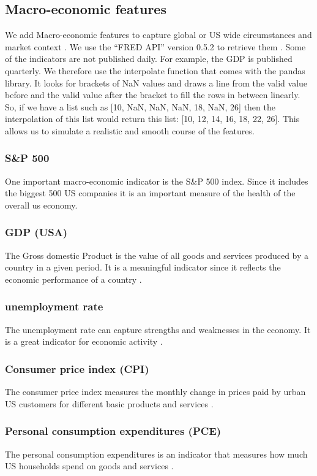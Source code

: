 \documentclass[a4paper,12pt]{report}
\begin{document}
			
		\subsection{Macro-economic features}
		We add Macro-economic features to capture global or US wide circumstances and market context \cite{38}. We use the “FRED API” version 0.5.2 to retrieve them \cite{37}. Some of the indicators are not published daily. For example, the GDP is published quarterly. We therefore use the interpolate function that comes with the pandas library. It looks for brackets of NaN values and draws a line from the valid value before and the valid value after the bracket to fill the rows in between linearly. So, if we have a list such as [10, NaN, NaN, NaN, 18, NaN, 26] then the interpolation of this list would return this list: [10, 12, 14, 16, 18, 22, 26]. This allows us to simulate a realistic and smooth course of the features.
			\subsubsection{S\&P 500}
			One important macro-economic indicator is the S\&P 500 index. Since it includes the biggest 500 US companies it is an important measure of the health of the overall us economy.
			\subsubsection{GDP (USA)}
			The Gross domestic Product is the value of all goods and services produced by a country in a given period. It is a meaningful indicator since it reflects the economic performance of a country \cite{38}.
			\subsubsection{unemployment rate}
			The unemployment rate can capture strengths and weaknesses in the economy. It is a great indicator for economic activity \cite{38}.
			\subsubsection{Consumer price index (CPI)}
			The consumer price index measures the monthly change in prices paid by urban US customers for different basic products and services \cite{39}.
			\subsubsection{Personal consumption expenditures (PCE)}
			The personal consumption expenditures is an indicator that measures how much US households spend on goods and services \cite{41}.
\end{document}
